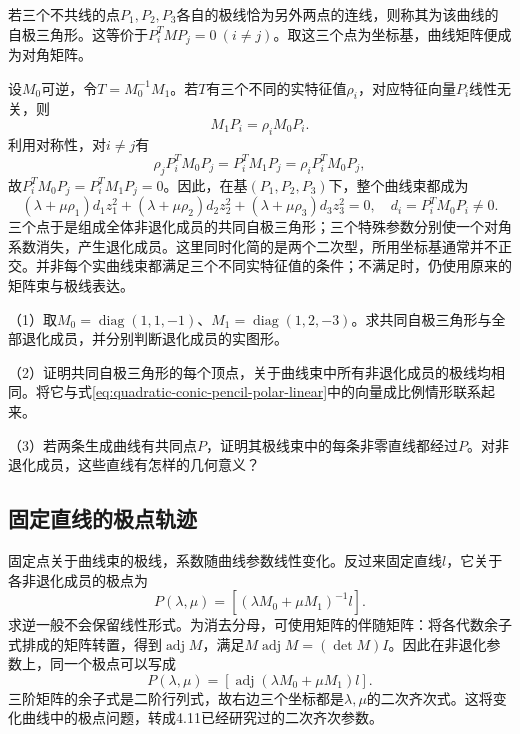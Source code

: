 若三个不共线的点\(P_1,P_2,P_3\)各自的极线恰为另外两点的连线，则称其为该曲线的{\heiti{}自极三角形}。这等价于\(P_i^TMP_j=0\ (i\ne j)\)。取这三个点为坐标基，曲线矩阵便成为对角矩阵。

设\(M_0\)可逆，令\(T=M_0^{-1}M_1\)。若\(T\)有三个不同的实特征值\(\rho_i\)，对应特征向量\(P_i\)线性无关，则
\begin{equation*}
 M_1P_i=\rho_iM_0P_i.
\end{equation*}
利用对称性，对\(i\ne j\)有
\begin{equation*}
 \rho_jP_i^TM_0P_j=P_i^TM_1P_j
 =\rho_iP_i^TM_0P_j,
\end{equation*}
故\(P_i^TM_0P_j=P_i^TM_1P_j=0\)。因此，在基\((P_1,P_2,P_3)\)下，整个曲线束都成为
\begin{equation}\label{eq:quadratic-common-self-polar-diagonal}
 (\lambda+\mu\rho_1)d_1z_1^2+
 (\lambda+\mu\rho_2)d_2z_2^2+
 (\lambda+\mu\rho_3)d_3z_3^2=0,
 \quad d_i=P_i^TM_0P_i\ne0.
\end{equation}
三个点于是组成全体非退化成员的共同自极三角形；三个特殊参数分别使一个对角系数消失，产生退化成员。这里同时化简的是两个二次型，所用坐标基通常并不正交。并非每个实曲线束都满足三个不同实特征值的条件；不满足时，仍使用原来的矩阵束与极线表达。

\begin{exercise}
\mbox{}\par\nobreak

（1）取\(M_0=\operatorname{diag}(1,1,-1)\)、\(M_1=\operatorname{diag}(1,2,-3)\)。求共同自极三角形与全部退化成员，并分别判断退化成员的实图形。

（2）证明共同自极三角形的每个顶点，关于曲线束中所有非退化成员的极线均相同。将它与式\eqref{eq:quadratic-conic-pencil-polar-linear}中的向量成比例情形联系起来。

（3）若两条生成曲线有共同点\(P\)，证明其极线束中的每条非零直线都经过\(P\)。对非退化成员，这些直线有怎样的几何意义？
\end{exercise}

\subsection{固定直线的极点轨迹}
\label{subsec:quadratic-fixed-line-poles}

固定点关于曲线束的极线，系数随曲线参数线性变化。反过来固定直线\(l\)，它关于各非退化成员的极点为
\begin{equation*}
 P(\lambda,\mu)=[(\lambda M_0+\mu M_1)^{-1}l].
\end{equation*}
求逆一般不会保留线性形式。为消去分母，可使用矩阵的{\heiti{}伴随矩阵}：将各代数余子式排成的矩阵转置，得到\(\operatorname{adj}M\)，满足\(M\operatorname{adj}M=(\det M)I\)。因此在非退化参数上，同一个极点可以写成
\begin{equation}\label{eq:quadratic-conic-pencil-pole-quadratic}
 P(\lambda,\mu)=
 [\operatorname{adj}(\lambda M_0+\mu M_1)l].
\end{equation}
三阶矩阵的余子式是二阶行列式，故右边三个坐标都是\(\lambda,\mu\)的二次齐次式。这将变化曲线中的极点问题，转成4.11已经研究过的二次齐次参数。

